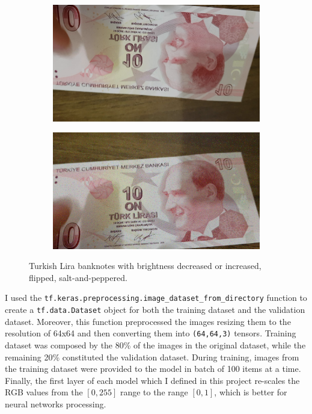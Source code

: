 \documentclass{article}
\begin{document}
\begin{figure}[h]
    \begin{subfigure}[b]{0.45\textwidth}
        \centering
        \includegraphics[width=\textwidth]{10_flipped}
    \end{subfigure}
    \begin{subfigure}[b]{0.45\textwidth}
        \centering
        \includegraphics[width=\textwidth]{10_saltAndPeppered}
    \end{subfigure}
    \caption{Turkish Lira banknotes with brightness decreased or increased, flipped, salt-and-peppered.}
    \label{fig:bankonote_10}
\end{figure}

I used the \texttt{tf\-.keras\-.pre\-pro\-ces\-sing\-.image\_\-dataset\_\-from\_\-directory} function to create a \texttt{tf\-.data\-.Dataset} object for both the training dataset and the validation dataset.
Moreover, this function preprocessed the images resizing them to the resolution of 64x64 and then converting them into \texttt{(64,64,3)} tensors.
Training dataset was composed by the 80\% of the images in the original dataset, while the remaining 20\% constituted the validation dataset.
During training, images from the training dataset were provided to the model in batch of 100 items at a time.
Finally, the first layer of each model which I defined in this project re-scales the RGB values from the $[0,255]$ range to the range $[0,1]$, which is better for neural networks processing.
\end{document}
